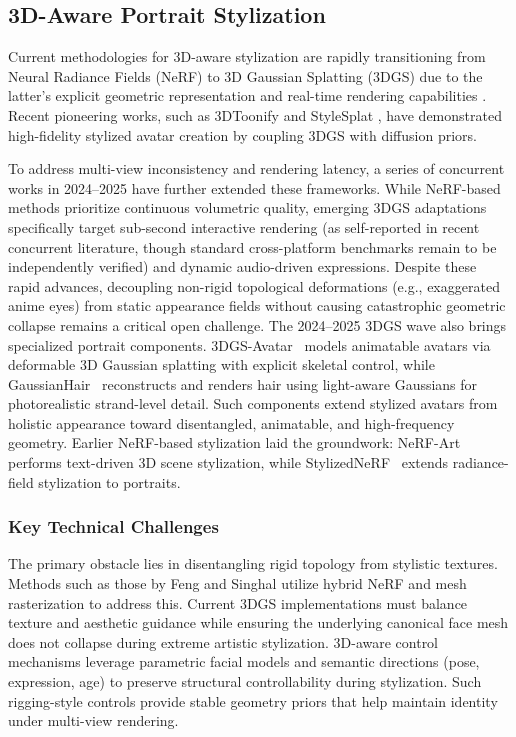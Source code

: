 \documentclass[journal]{IEEEtran}
\begin{document}
\subsection{3D-Aware Portrait Stylization}
\label{sec:advanced:3d}
Current methodologies for 3D-aware stylization are rapidly transitioning from Neural Radiance Fields (NeRF) to 3D Gaussian Splatting (3DGS) due to the latter's explicit geometric representation and real-time rendering capabilities \cite{chen20253dstylization}. Recent pioneering works, such as 3DToonify \cite{threedtoonify2024} and StyleSplat \cite{jain2024stylesplat}, have demonstrated high-fidelity stylized avatar creation by coupling 3DGS with diffusion priors.

To address multi-view inconsistency and rendering latency, a series of concurrent works in 2024--2025 have further extended these frameworks. While NeRF-based methods prioritize continuous volumetric quality, emerging 3DGS adaptations specifically target sub-second interactive rendering (as self-reported in recent concurrent literature, though standard cross-platform benchmarks remain to be independently verified) and dynamic audio-driven expressions. Despite these rapid advances, decoupling non-rigid topological deformations (e.g., exaggerated anime eyes) from static appearance fields without causing catastrophic geometric collapse remains a critical open challenge. The 2024--2025 3DGS wave also brings specialized portrait components. 3DGS-Avatar~\cite{qian20243dgsavatar} models animatable avatars via deformable 3D Gaussian splatting with explicit skeletal control, while GaussianHair~\cite{luo2024gaussianhair} reconstructs and renders hair using light-aware Gaussians for photorealistic strand-level detail. Such components extend stylized avatars from holistic appearance toward disentangled, animatable, and high-frequency geometry. Earlier NeRF-based stylization laid the groundwork: NeRF-Art~\cite{wang2022nerf} performs text-driven 3D scene stylization, while StylizedNeRF~\cite{huang2022stylizednerf} extends radiance-field stylization to portraits.

\subsubsection{Key Technical Challenges}
The primary obstacle lies in disentangling rigid topology from stylistic textures. Methods such as those by Feng and Singhal \cite{feng20233dfs} utilize hybrid NeRF and mesh rasterization to address this. Current 3DGS implementations must balance texture and aesthetic guidance while ensuring the underlying canonical face mesh does not collapse during extreme artistic stylization.
\label{sec:advanced:3d:rigging}
3D-aware control mechanisms leverage parametric facial models and semantic directions (pose, expression, age) to preserve structural controllability during stylization. Such rigging-style controls provide stable geometry priors that help maintain identity under multi-view rendering.
\end{document}
